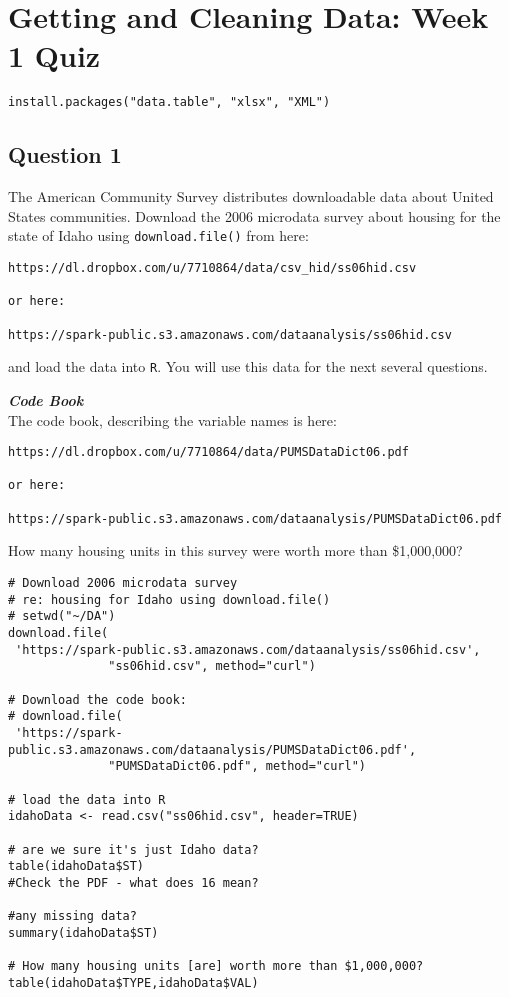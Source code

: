 \documentclass[]{article}
\begin{document}
\section{Getting and Cleaning Data: Week 1 Quiz}
\begin{verbatim}
install.packages("data.table", "xlsx", "XML")
\end{verbatim}
\newpage
\subsection*{Question 1}

The American Community Survey distributes downloadable data about United States communities. 
Download the 2006 microdata survey about housing for the state of Idaho using \texttt{download.file()} from here: 

\begin{verbatim}
https://dl.dropbox.com/u/7710864/data/csv_hid/ss06hid.csv

or here:

https://spark-public.s3.amazonaws.com/dataanalysis/ss06hid.csv 
\end{verbatim}
and load the data into \texttt{R}. You will use this data for the next several questions. 

\noindent \textbf{\textit{Code Book}}\\
The code book, describing the variable names is here: 

\begin{verbatim}
https://dl.dropbox.com/u/7710864/data/PUMSDataDict06.pdf

or here: 

https://spark-public.s3.amazonaws.com/dataanalysis/PUMSDataDict06.pdf
\end{verbatim}
\bigskip
How many housing units in this survey were worth more than \$1,000,000?

\begin{framed}
\begin{verbatim}
# Download 2006 microdata survey 
# re: housing for Idaho using download.file()
# setwd("~/DA")
download.file(
 'https://spark-public.s3.amazonaws.com/dataanalysis/ss06hid.csv',
              "ss06hid.csv", method="curl")

# Download the code book:
# download.file(
 'https://spark-public.s3.amazonaws.com/dataanalysis/PUMSDataDict06.pdf',
              "PUMSDataDict06.pdf", method="curl")

# load the data into R
idahoData <- read.csv("ss06hid.csv", header=TRUE)

# are we sure it's just Idaho data?
table(idahoData$ST)
#Check the PDF - what does 16 mean?

#any missing data?
summary(idahoData$ST)

# How many housing units [are] worth more than $1,000,000?
table(idahoData$TYPE,idahoData$VAL)
\end{verbatim}
\end{framed}
\end{document}
